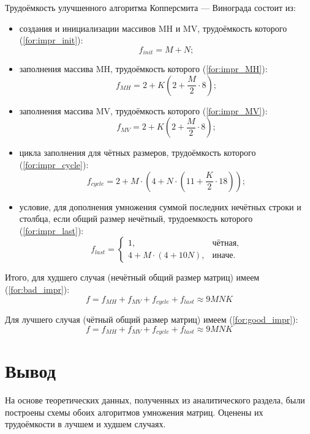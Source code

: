 Трудоёмкость улучшенного алгоритма Копперсмита — Винограда состоит из:
\begin{itemize}
	\item создания и инициализации массивов MH и MV, трудоёмкость которого (\ref{for:impr_init}):
	\begin{equation}
		\label{for:impr_init}
		f_{init} = M + N;
	\end{equation}
	
	\item заполнения массива MH, трудоёмкость которого (\ref{for:impr_MH}):
	\begin{equation}
		\label{for:impr_MH}
		f_{MH} =  2 + K (2 + \frac{M}{2} \cdot 8);
	\end{equation}
	
	\item заполнения массива MV, трудоёмкость которого (\ref{for:impr_MV}):
	\begin{equation}
		\label{for:impr_MV}
		f_{MV} =  2 + K (2 + \frac{M}{2} \cdot 8);
	\end{equation}
	
	\item цикла заполнения для чётных размеров, трудоёмкость которого (\ref{for:impr_cycle}):
	\begin{equation}
		\label{for:impr_cycle}
		f_{cycle} =2 + M \cdot (4 + N \cdot (11 + \frac{K}{2} \cdot 18));
	\end{equation}
	
	\item условие, для дополнения умножения суммой последних нечётных строки и столбца, если общий размер нечётный, трудоемкость которого (\ref{for:impr_last}):
	\begin{equation}
		\label{for:impr_last}
		f_{last} = 
		\begin{cases}
			1, & \text{чётная,}\\
			4 + M \cdot (4 + 10N), & \text{иначе.}
		\end{cases}
	\end{equation}
\end{itemize}

Итого, для худшего случая (нечётный общий размер матриц) имеем (\ref{for:bad_impr}):
\begin{equation}
	\label{for:bad_impr}
	f = f_{MH} + f_{MV} + f_{cycle} + f_{last} \approx 9MNK
\end{equation}

Для лучшего случая (чётный общий размер матриц) имеем (\ref{for:good_impr}):
\begin{equation}
	\label{for:good_impr}
	f = f_{MH} + f_{MV} + f_{cycle} + f_{last} \approx 9MNK
\end{equation}


\section*{Вывод}

На основе теоретических данных, полученных из аналитического раздела, были построены схемы обоих алгоритмов умножения матриц.  Оценены их трудоёмкости в лучшем и худшем случаях.
